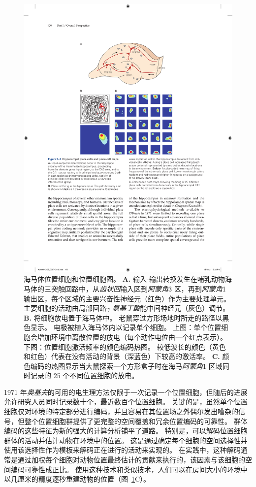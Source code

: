 \begin{figure}[htbp]
	\centering
	\includegraphics[width=0.9\linewidth]{chap05/fig_5_1}
	\caption{海马体位置细胞和位置细胞图。 
		\textbf{A.} 输入-输出转换发生在哺乳动物海马体的三突触回路中，从\textit{齿状回}输入区到\textit{阿蒙角}3 区，再到\textit{阿蒙角}1 输出区，每个区域的主要兴奋性神经元（红色）作为主要处理单元。
		主要细胞的活动由局部回路\textit{$\gamma$-氨基丁酸}能中间神经元（灰色）调节。
		\textbf{B.} 将细胞放电置于海马体中。
		老鼠穿过方形场地时所走的路径以黑色显示。
		电极被植入海马体内以记录单个细胞。
		上图：单个位置细胞会增加环境中离散位置的放电（每个动作电位由一个红点表示）。
		下图：位置细胞激活频率的颜色编码热图。
		较低波长的颜色（黄色和红色）代表在没有活动的背景（深蓝色）下较高的激活率。 
		\textbf{C.} 颜色编码的热图显示当大鼠探索一个方形盒子时在海马\textit{阿蒙角}1 区域同时记录的 25 个不同位置细胞的放电。}
	\label{fig:5_1}
\end{figure}


1971 年\textit{奥基夫}的可用的电生理方法仅限于一次记录一个位置细胞，但随后的进展允许研究人员同时记录数十个，最近数百个位置细胞。
关键的是，虽然单个位置细胞仅对环境的特定部分进行编码，并且容易在其位置场之外偶尔发出嘈杂的信号，但整个位置细胞群提供了更完整的空间覆盖和冗余位置编码的可靠性。
群体编码的这些特征为新的强大的计算分析铺平了道路。
特别是，可以解码位置细胞群体的活动并估计动物在环境中的位置。
这是通过确定每个细胞的空间选择性并使用该选择性作为模板来解码正在进行的活动来实现的。
在实践中，这种解码通常是通过加权每个细胞对动物位置最终估计的贡献来执行的，该因素与该细胞的空间编码可靠性成正比。
使用这种技术和类似技术，人们可以在房间大小的环境中以几厘米的精度逐秒重建动物的位置（图~\ref{fig:5_1}C）。



